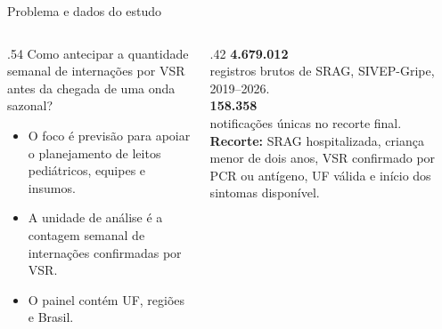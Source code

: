 \documentclass[10pt,aspectratio=169]{beamer}
\begin{document}
\begin{frame}{Problema e dados do estudo}
  \begin{columns}[T,onlytextwidth]
    \begin{column}{.54\textwidth}
      \large Como antecipar a quantidade semanal de internações por VSR antes da chegada de uma onda sazonal?\par\vspace{.35cm}
      \begin{itemize}
        \item O foco é previsão para apoiar o planejamento de leitos pediátricos, equipes e insumos.
        \item A unidade de análise é a contagem semanal de internações confirmadas por VSR.
        \item O painel contém UF, regiões e Brasil.
      \end{itemize}
    \end{column}
    \begin{column}{.42\textwidth}
      \textcolor{pucblue}{\Large\textbf{4.679.012}}\\[-.1cm]
      \small registros brutos de SRAG, SIVEP-Gripe, 2019--2026.\\[.38cm]
      \textcolor{pucblue}{\Large\textbf{158.358}}\\[-.1cm]
      \small notificações únicas no recorte final.\\[.38cm]
      \small \textbf{Recorte:} SRAG hospitalizada, criança menor de dois anos, VSR confirmado por PCR ou antígeno, UF válida e início dos sintomas disponível.
    \end{column}
  \end{columns}
\end{frame}
\end{document}
